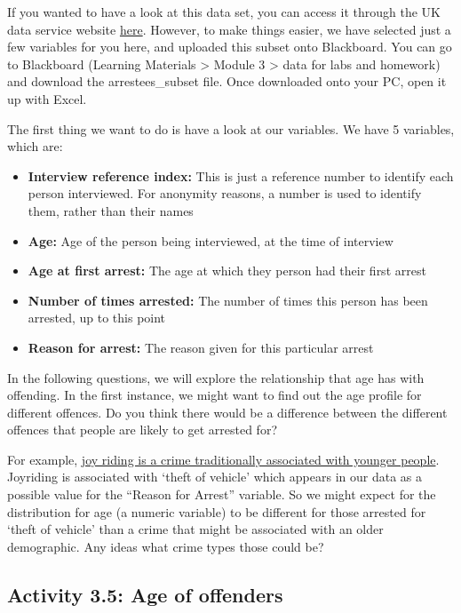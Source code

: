 \documentclass[
]{book}
\providecommand{\tightlist}{%
  \setlength{\itemsep}{0pt}\setlength{\parskip}{0pt}}
\begin{document}
If you wanted to have a look at this data set, you can access it through the UK data service website \href{https://discover.ukdataservice.ac.uk/catalogue/?sn=5807}{here}. However, to make things easier, we have selected just a few variables for you here, and uploaded this subset onto Blackboard. You can go to Blackboard (Learning Materials \textgreater{} Module 3 \textgreater{} data for labs and homework) and download the arrestees\_subset file. Once downloaded onto your PC, open it up with Excel.

The first thing we want to do is have a look at our variables. We have 5 variables, which are:

\begin{itemize}
\tightlist
\item
  \textbf{Interview reference index:} This is just a reference number to identify each person interviewed. For anonymity reasons, a number is used to identify them, rather than their names\\
\item
  \textbf{Age:} Age of the person being interviewed, at the time of interview
\item
  \textbf{Age at first arrest:} The age at which they person had their first arrest\\
\item
  \textbf{Number of times arrested:} The number of times this person has been arrested, up to this point
\item
  \textbf{Reason for arrest:} The reason given for this particular arrest
\end{itemize}

In the following questions, we will explore the relationship that age has with offending. In the first instance, we might want to find out the age profile for different offences. Do you think there would be a difference between the different offences that people are likely to get arrested for?

For example, \href{http://www.tandfonline.com/doi/abs/10.1080/10683160512331316343}{joy riding is a crime traditionally associated with younger people}. Joyriding is associated with `theft of vehicle' which appears in our data as a possible value for the ``Reason for Arrest'' variable. So we might expect for the distribution for age (a numeric variable) to be different for those arrested for `theft of vehicle' than a crime that might be associated with an older demographic. Any ideas what crime types those could be?

\hypertarget{activity-3.5-age-of-offenders}{%
\subsection{Activity 3.5: Age of offenders}\label{activity-3.5-age-of-offenders}}
\end{document}
